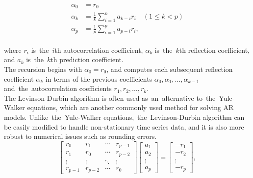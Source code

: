 \begin{equation*}
    \begin{aligned}
        \alpha_0 &= r_0 \\
        \alpha_k &= \frac{1}{k} \sum_{i=1}^{k} a_{k-i} r_i \quad (1 \leq k < p) \\
        \alpha_p &= \frac{1}{p} \sum_{i=1}^{p} a_{p-i} r_i,
    \end{aligned}
\end{equation*}
\\
where $r_i$ is~the~$i$th autocorrelation coefficient, $\alpha_k$ is~the~$k$th reflection coefficient, and $a_k$ is~the~$k$th
prediction coefficient.
\\
The recursion begins with $\alpha_0 = r_0$, and computes each subsequent reflection coefficient $\alpha_k$ in terms of the
previous coefficients $\alpha_0, \alpha_1, \ldots, \alpha_{k-1}$ and~the~autocorrelation coefficients $r_1, r_2, \ldots, r_k$.\\
The Levinson-Durbin algorithm is often used as~an~alternative to~the~Yule-Walker equations, which are another commonly
used method for solving AR models. Unlike~the~Yule-Walker equations,~the~Levinson-Durbin algorithm can be easily
modified to handle non-stationary time series data, and it is also more robust to numerical issues such as
rounding errors.\\
\begin{equation*}
    \begin{bmatrix}
        r_0     & r_1     & \cdots & r_{p-1} \\
        r_1     & r_0     & \cdots & r_{p-2} \\
        \vdots  & \vdots  & \ddots & \vdots  \\
        r_{p-1} & r_{p-2} & \cdots & r_0
    \end{bmatrix}
    \begin{bmatrix}
        a_1    \\
        a_2    \\
        \vdots \\
        a_p
    \end{bmatrix}
    =
    \begin{bmatrix}
        -r_1   \\
        -r_2   \\
        \vdots \\
        -r_p
    \end{bmatrix},
\end{equation*}

